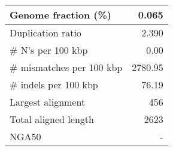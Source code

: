 \documentclass[12pt,a4paper]{article}
\begin{document}
\begin{table}[ht]
\begin{center}
\begin{tabular}{|l*{1}{|r}|}
Genome fraction (\%) & 0.065 \\ \hline
Duplication ratio & 2.390 \\ \hline
\# N's per 100 kbp & 0.00 \\ \hline
\# mismatches per 100 kbp & 2780.95 \\ \hline
\# indels per 100 kbp & 76.19 \\ \hline
Largest alignment & 456 \\ \hline
Total aligned length & 2623 \\ \hline
NGA50 & - \\ \hline
\end{tabular}
\end{center}
\end{table}
\end{document}
